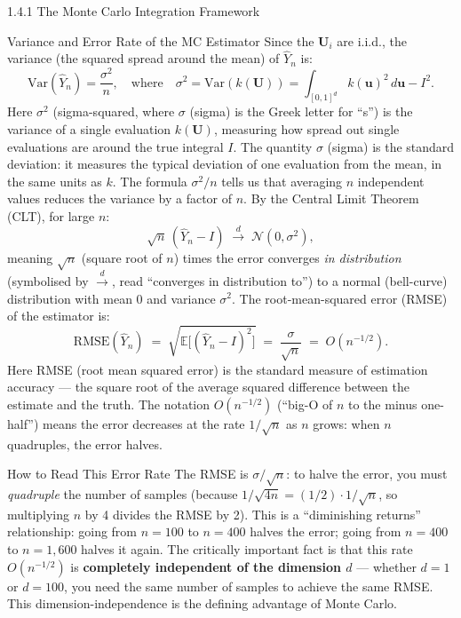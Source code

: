 \documentclass[aspectratio=169,10pt]{beamer}
\begin{document}
\begin{frame}[allowframebreaks]{1.4.1 The Monte Carlo Integration Framework}
  \begin{block}{Variance and Error Rate of the MC Estimator}
    Since the $\mathbf{U}_i$ are i.i.d., the variance (the squared spread
    around the mean) of $\hat{Y}_n$ is:
    \[
      \mathrm{Var}(\hat{Y}_n) = \frac{\sigma^2}{n},
      \quad\text{where}\quad
      \sigma^2 = \mathrm{Var}(k(\mathbf{U}))
      = \int_{[0,1]^d} k(\mathbf{u})^2\, d\mathbf{u} - I^2.
    \]
    Here $\sigma^2$ (sigma-squared, where $\sigma$ (sigma) is the Greek letter
    for ``s'') is the variance of a single evaluation $k(\mathbf{U})$, measuring
    how spread out single evaluations are around the true integral $I$.  The
    quantity $\sigma$ (sigma) is the standard deviation: it measures the typical
    deviation of one evaluation from the mean, in the same units as $k$.  The
    formula $\sigma^2/n$ tells us that averaging $n$ independent values reduces
    the variance by a factor of $n$.  By the Central Limit Theorem (CLT), for
    large $n$:
    \[
      \sqrt{n}\,(\hat{Y}_n - I) \;\xrightarrow{d}\; \mathcal{N}(0, \sigma^2),
    \]
    meaning $\sqrt{n}$ (square root of $n$) times the error converges \emph{in
    distribution} (symbolised by $\xrightarrow{d}$, read ``converges in
    distribution to'') to a normal (bell-curve) distribution with mean 0 and
    variance $\sigma^2$.  The root-mean-squared error (RMSE) of the estimator is:
    \[
      \mathrm{RMSE}(\hat{Y}_n)
      \;=\; \sqrt{\mathbb{E}\bigl[(\hat{Y}_n - I)^2\bigr]}
      \;=\; \frac{\sigma}{\sqrt{n}}
      \;=\; O(n^{-1/2}).
    \]
    Here RMSE (root mean squared error) is the standard measure of estimation
    accuracy --- the square root of the average squared difference between the
    estimate and the truth.  The notation $O(n^{-1/2})$ (``big-O of $n$ to the
    minus one-half'') means the error decreases at the rate $1/\sqrt{n}$ as $n$
    grows: when $n$ quadruples, the error halves.
  \end{block}

  \begin{alertblock}{How to Read This Error Rate}
    The RMSE is $\sigma/\sqrt{n}$: to halve the error, you must
    \emph{quadruple} the number of samples (because $1/\sqrt{4n} =
    (1/2) \cdot 1/\sqrt{n}$, so multiplying $n$ by 4 divides the RMSE by 2).
    This is a ``diminishing returns'' relationship: going from $n = 100$ to
    $n = 400$ halves the error; going from $n = 400$ to $n = 1{,}600$ halves
    it again.  The critically important fact is that this rate $O(n^{-1/2})$
    is \textbf{completely independent of the dimension $d$} --- whether $d = 1$
    or $d = 100$, you need the same number of samples to achieve the same RMSE.
    This dimension-independence is the defining advantage of Monte Carlo.
  \end{alertblock}


\end{frame}
\end{document}
